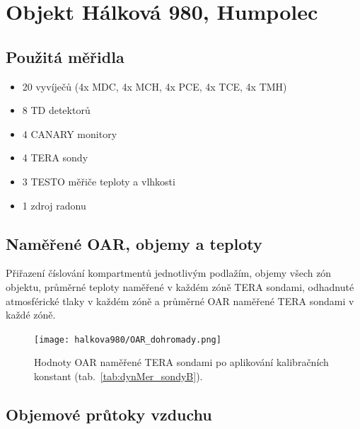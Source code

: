 
\section{Objekt Hálková 980, Humpolec}
\subsection{Použitá měřidla}
\begin{itemize}
    \setlength\itemsep{0em}
	\item 20 vyvíječů (4x MDC, 4x MCH, 4x PCE, 4x TCE, 4x TMH)
	\item 8 TD detektorů
	\item 4 CANARY monitory
	\item 4 TERA sondy
	\item 3 TESTO měřiče teploty a vlhkosti
	\item 1 zdroj radonu
\end{itemize}

\subsection{Naměřené OAR, objemy a teploty}

\begin{table}[H]
    \centering
    \caption{Přiřazení číslování kompartmentů jednotlivým podlažím, objemy všech zón objektu, průměrné teploty naměřené v každém zóně TERA sondami, odhadnuté atmosférické tlaky v každém zóně a průměrné OAR naměřené TERA sondami v každé zóně.}
    \label{tab:halkova980_objemy}
    
\end{table}
\begin{figure}[H]
    \centering
    \texttt{[image: halkova980/OAR\_dohromady.png]}
    \caption{Hodnoty OAR naměřené TERA sondami po aplikování kalibračních konstant (tab.~\ref{tab:dynMer_sondyB}).}
    \label{fig:halkova980_OARdohromady}
\end{figure}

\subsection{Objemové průtoky vzduchu}

